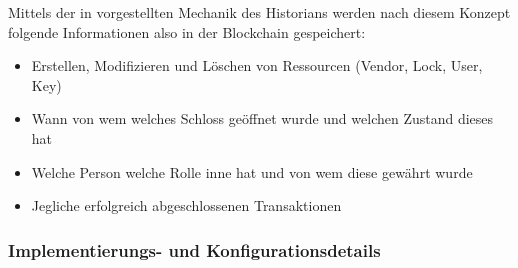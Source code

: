         \noindent Mittels der in  vorgestellten Mechanik des Historians werden nach diesem Konzept folgende Informationen also in der Blockchain gespeichert:
        \begin{itemize}[noitemsep]
            \item Erstellen, Modifizieren und Löschen von Ressourcen (Vendor, Lock, User, Key)
            \item Wann von wem welches Schloss geöffnet wurde und welchen Zustand dieses hat
            \item Welche Person welche Rolle inne hat und von wem diese gewährt wurde
            \item Jegliche erfolgreich abgeschlossenen Transaktionen
        \end{itemize}
        
    \subsubsection{Implementierungs- und Konfigurationsdetails}
    \label{sec:prototype_arch_impl}
